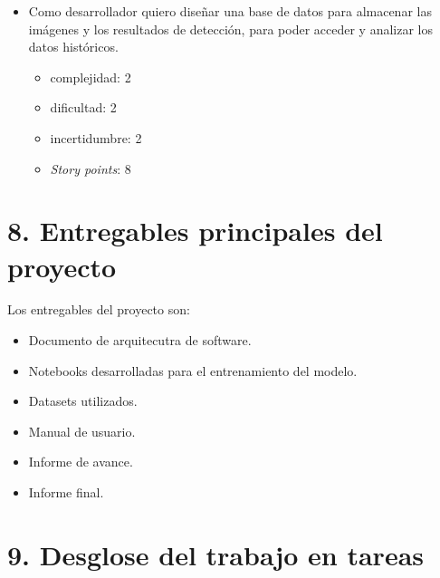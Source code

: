 \documentclass[
11pt %
]{charter}
\begin{document}
\begin{itemize}
\item Como desarrollador quiero diseñar una base de datos para almacenar las imágenes y los resultados de detección, para poder acceder y analizar los datos históricos.
	\begin{itemize}
	\item complejidad: 2
	\item dificultad: 2
	\item incertidumbre: 2
	\item \textit{Story points}: 8 
	\end{itemize}
\end{itemize}

\section{8. Entregables principales del proyecto}
\label{sec:entregables}

Los entregables del proyecto son:

\begin{itemize}
	\item Documento de arquitecutra de software.
	\item Notebooks desarrolladas para el entrenamiento del modelo.
	\item Datasets utilizados.
	\item Manual de usuario.
	\item Informe de avance.
	\item Informe final.
\end{itemize}

\section{9. Desglose del trabajo en tareas}
\label{sec:wbs}
\end{document}
